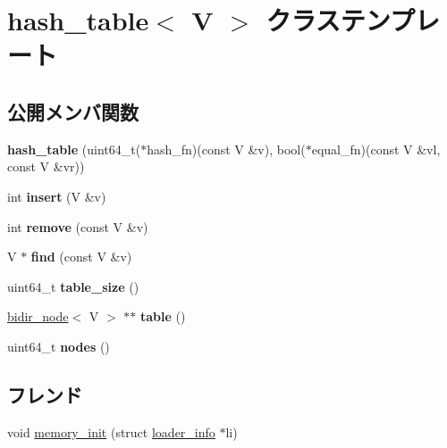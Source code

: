 \hypertarget{classhash__table}{}\section{hash\+\_\+table$<$ V $>$ クラステンプレート}
\label{classhash__table}
\subsection*{公開メンバ関数}
\begin{DoxyCompactItemize}
\item 
\hypertarget{classhash__table_a5e4a74748ecad78e798739a03be056cb}{}{\bfseries hash\+\_\+table} (uint64\+\_\+t($\ast$hash\+\_\+fn)(const V \&v), bool($\ast$equal\+\_\+fn)(const V \&vl, const V \&vr))\label{classhash__table_a5e4a74748ecad78e798739a03be056cb}

\item 
\hypertarget{classhash__table_a9e02312051be1517ad16ee8164af07dd}{}int {\bfseries insert} (V \&v)\label{classhash__table_a9e02312051be1517ad16ee8164af07dd}

\item 
\hypertarget{classhash__table_a8ac0d9136be9250f7059d07099a4393e}{}int {\bfseries remove} (const V \&v)\label{classhash__table_a8ac0d9136be9250f7059d07099a4393e}

\item 
\hypertarget{classhash__table_ae6968f84ffa245688a2fd8eebb86e7a6}{}V $\ast$ {\bfseries find} (const V \&v)\label{classhash__table_ae6968f84ffa245688a2fd8eebb86e7a6}

\item 
\hypertarget{classhash__table_a2ae018dc5310c3bf887dec199a445eeb}{}uint64\+\_\+t {\bfseries table\+\_\+size} ()\label{classhash__table_a2ae018dc5310c3bf887dec199a445eeb}

\item 
\hypertarget{classhash__table_ace4fefe428377b31e479f516aad83e72}{}\hyperlink{classbidir__node}{bidir\+\_\+node}$<$ V $>$ $\ast$$\ast$ {\bfseries table} ()\label{classhash__table_ace4fefe428377b31e479f516aad83e72}

\item 
\hypertarget{classhash__table_accb6f8935ae8965655975426140d9447}{}uint64\+\_\+t {\bfseries nodes} ()\label{classhash__table_accb6f8935ae8965655975426140d9447}

\end{DoxyCompactItemize}
\subsection*{フレンド}
\begin{DoxyCompactItemize}
\item 
void \hyperlink{classhash__table_a8840f01b46a3b9c43a461591a579c1bd}{memory\+\_\+init} (struct \hyperlink{structloader__info}{loader\+\_\+info} $\ast$li)
\end{DoxyCompactItemize}



